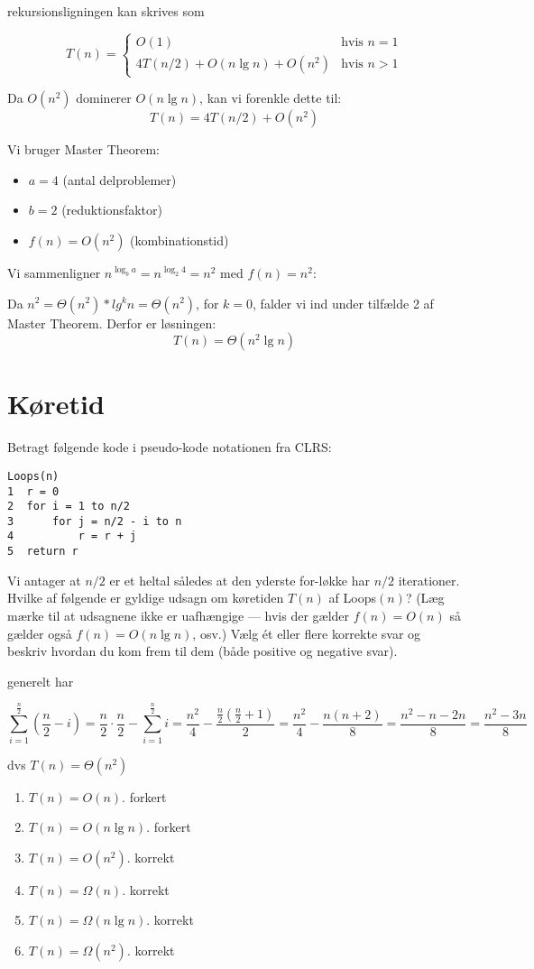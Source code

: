 \documentclass{article}
\theoremstyle{definition}
\begin{document}
rekursionsligningen kan skrives som

\[
T(n) = \begin{cases}
O(1) & \text{hvis } n = 1 \\
4T(n/2) + O(n\lg n) + O(n^2) & \text{hvis } n > 1
\end{cases}
\]

Da $O(n^2)$ dominerer $O(n\lg n)$, kan vi forenkle dette til:
\[
T(n) = 4T(n/2) + O(n^2)
\]

Vi bruger Master Theorem:
\begin{itemize}
    \item $a = 4$ (antal delproblemer)
    \item $b = 2$ (reduktionsfaktor)
    \item $f(n) = O(n^2)$ (kombinationstid)
\end{itemize}

Vi sammenligner $n^{\log_b a} = n^{\log_2 4} = n^2$ med $f(n) = n^2$:

Da $n^2 = \Theta(n^2)*lg^{k} n = \Theta(n^2)$, for $k = 0$, falder vi ind under tilfælde 2 af Master Theorem.
Derfor er løsningen:
\[ T(n) = \Theta(n^2 \lg n) \]

\section{Køretid}
Betragt følgende kode i pseudo-kode notationen fra CLRS:

\begin{verbatim}
Loops(n)
1  r = 0
2  for i = 1 to n/2
3      for j = n/2 - i to n
4          r = r + j
5  return r
\end{verbatim}

Vi antager at $n/2$ er et heltal således at den yderste for-løkke har $n/2$ iterationer. Hvilke af følgende er gyldige udsagn om køretiden $T(n)$ af Loops$(n)$? (Læg mærke til at udsagnene ikke er uafhængige --- hvis der gælder $f(n) = O(n)$ så gælder også $f(n) = O(n\lg n)$, osv.) Vælg ét eller flere korrekte svar og beskriv hvordan du kom frem til dem (både positive og negative svar).

generelt har 

\[
\sum_{i=1}^{\frac{n}{2}} (\frac{n}{2} - i) = \frac{n}{2} \cdot \frac{n}{2} - \sum_{i=1}^{\frac{n}{2}} i = \frac{n^2}{4} - \frac{\frac{n}{2}(\frac{n}{2}+1)}{2} = \frac{n^2}{4} - \frac{n(n+2)}{8} = \frac{n^2-n-2n}{8} = \frac{n^2-3n}{8}
\]

dvs $T(n) = \Theta(n^2) $

\begin{enumerate}
    \item $T(n) = O(n)$. forkert
    \item $T(n) = O(n\lg n)$. forkert
    \item $T(n) = O(n^2)$. korrekt
    \item $T(n) = \Omega(n)$. korrekt 
    \item $T(n) = \Omega(n\lg n)$. korrekt
    \item $T(n) = \Omega(n^2)$. korrekt
\end{enumerate}
\end{document}
